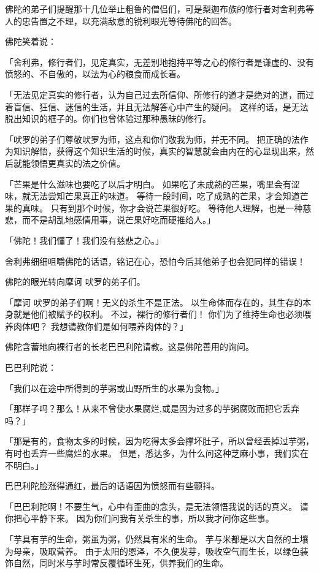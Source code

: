 \documentclass[twoside,openany]{book}
\begin{document}
佛陀的弟子们提醒那十几位举止粗鲁的僧侣们，可是梨迦布族的修行者对舍利弗等人的忠告置之不理，以充满敌意的锐利眼光等待佛陀的回答。

佛陀笑着说：

「舍利弗，修行者们，见定真实，无差别地抱持平等之心的修行者是谦虚的、没有愤怒的、不自傲的，以法为心的粮食而成长着。

「无法见定真实的修行者，认为自己过去所信仰、所修行的道才是绝对的道，而过着盲信、狂信、迷信的生活，并且无法解答心中产生的疑问。
这样的话，是无法脱出知识的框子的。你们也曾体验过那种愚昧的修行。

「吠罗的弟子们尊敬吠罗为师，这点和你们敬我为师，并无不同。
把正确的法作为知识解悟，获得这个知识生活的时候，真实的智慧就会由内在的心显现出来，然后就能领悟更真实的法之价值。

「芒果是什么滋味也要吃了以后才明白。
如果吃了未成熟的芒果，嘴里会有涩味，就无法尝知芒果真正的味道。
等待一段时间，吃了成熟的芒果，才会知道芒果的真味。
只有到那个时候，你才会说芒果很好吃。
等待他人理解，也是一种慈悲，而不是胡乱地感情用事，说芒果好吃而硬推给人。」

「佛陀！我们懂了！我们没有慈悲之心。」

舍利弗细细咀嚼佛陀的话语，铭记在心，恐怕今后其他弟子也会犯同样的错误！

佛陀的眼光转向摩诃 \textperiodcentered 吠罗的弟子们。

「摩诃 \textperiodcentered 吠罗的弟子们啊！无义的杀生不是正法。
以生命体而存在的，其生存的本身就是他们被赋予的权利。
不过，裸行的修行者们！
你们为了维持生命也必须喂养肉体吧？
我想请教你们是如何喂养肉体的？」

佛陀含蓄地向裸行者的长老巴巴利陀请教。这是佛陀善用的询问。

巴巴利陀说：

「我们以在途中所得到的芋粥或山野所生的水果为食物。」

「那样子吗？那么！从来不曾使水果腐烂,或是因为过多的芋粥腐败而把它丢弃吗？」

「那是有的，食物太多的时候，因为吃得太多会撑坏肚子，所以曾经丢掉过芋粥，有时也丢弃一些腐烂的水果。
但是，悉达多，为什么问这种芝麻小事，我们实在不明白。」

巴巴利陀脸涨得通红，最后的话语因为愤怒而有些颤抖。

「巴巴利陀啊！不要生气，心中有歪曲的念头，是无法领悟我说的话的真义。
请你把心平静下来。
因为你们问我有关杀生的事，所以我才问你这些事。

「芋具有芋的生命，粥虽为粥，仍然具有米的生命。
芋与米都是以大自然的土壤为母亲，吸取营养。
由于太阳的恩泽，不久便发芽，吸收空气而生长，以绿色装饰自然，同时米与芋时常反覆循环生死，供养我们的生命。
\end{document}
